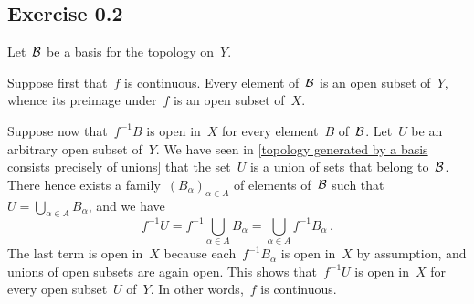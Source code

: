 \subsection{Exercise 0.2}

Let~$\mathcal{B}$ be a basis for the topology on~$Y$.

Suppose first that~$f$ is continuous.
Every element of~$\mathcal{B}$ is an open subset of~$Y$, whence its preimage under~$f$ is an open subset of~$X$.

Suppose now that~$f^{-1} B$ is open in~$X$ for every element~$B$ of~$\mathcal{B}$.
Let~$U$ be an arbitrary open subset of~$Y$.
We have seen in \cref{topology generated by a basis consists precisely of unions} that the set~$U$ is a union of sets that belong to~$\mathcal{B}$.
There hence exists a family~$(B_α)_{α ∈ A}$ of elements of~$\mathcal{B}$ such that~$U = ⋃_{α ∈ A} B_α$, and we have
\[
	f^{-1} U
	=
	f^{-1} ⋃_{α ∈ A} B_α
	=
	⋃_{α ∈ A} f^{-1} B_α \,.
\]
The last term is open in~$X$ because each~$f^{-1} B_α$ is open in~$X$ by assumption, and unions of open subsets are again open.
This shows that~$f^{-1} U$ is open in~$X$ for every open subset~$U$ of~$Y$.
In other words,~$f$ is continuous.
